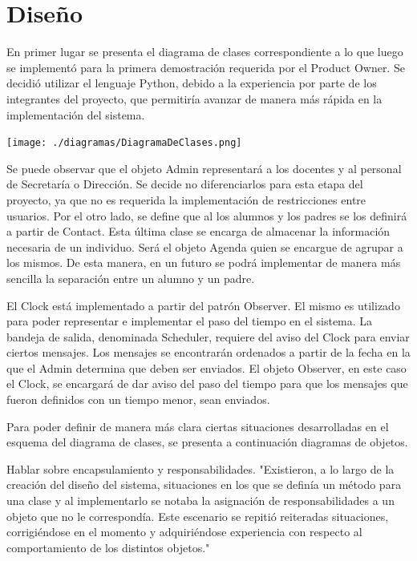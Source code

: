 \documentclass[a4paper, 11pt]{article}
\begin{document}
\newpage

\section{Diseño}
En primer lugar se presenta el diagrama de clases correspondiente a lo que luego se implementó para la primera demostración requerida por el Product Owner. Se decidió utilizar el lenguaje Python, debido a la experiencia por parte de los integrantes del proyecto, que permitiría avanzar de manera más rápida en la implementación del sistema. 

\centerline{\texttt{[image: ./diagramas/DiagramaDeClases.png]}}

Se puede observar que el objeto Admin representará a los docentes y al personal de Secretaría o Dirección. Se decide no diferenciarlos para esta etapa del proyecto, ya que no es requerida la implementación de restricciones entre usuarios. Por el otro lado, se define que al los alumnos y los padres se los definirá a partir de Contact. Esta última clase se encarga de almacenar la información necesaria de un individuo. Será el objeto Agenda quien se encargue de agrupar a los mismos. De esta manera, en un futuro se podrá implementar de manera más sencilla la separación entre un alumno y un padre. 

El Clock está implementado a partir del patrón Observer. El mismo es utilizado para poder representar e implementar el paso del tiempo en el sistema. La bandeja de salida, denominada Scheduler, requiere del aviso del Clock para enviar ciertos mensajes. Los mensajes se encontrarán ordenados a partir de la fecha en la que el Admin determina que deben ser enviados. El objeto Observer, en este caso el Clock, se encargará de dar aviso del paso del tiempo para que los mensajes que fueron definidos con un tiempo menor, sean enviados.

Para poder definir de manera más clara ciertas situaciones desarrolladas en el esquema del diagrama de clases, se presenta a continuación diagramas de objetos. 




Hablar sobre encapsulamiento y responsabilidades. "Existieron, a lo largo de la creación del diseño del sistema, situaciones en los que se definía un método para una clase y al implementarlo se notaba la asignación de responsabilidades a un objeto que no le correspondía. Este escenario se repitió reiteradas situaciones, corrigiéndose en el momento y adquiriéndose experiencia con respecto al comportamiento de los distintos objetos." %
\end{document}
